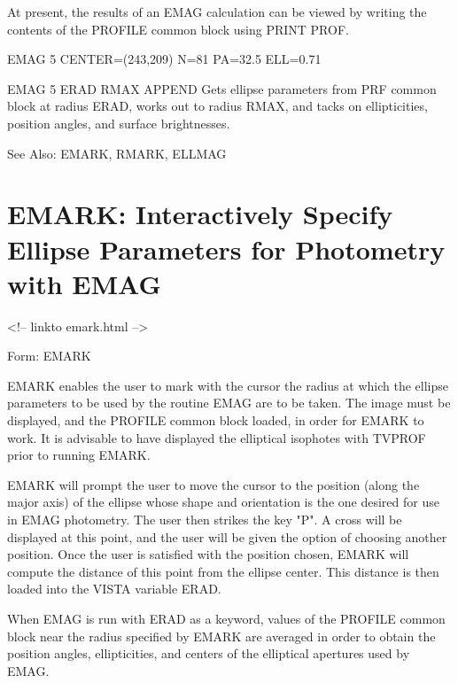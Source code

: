 At present, the results of an EMAG calculation can be viewed by writing the
contents of the PROFILE common block using PRINT PROF.

\begin{example}
  \item[EMAG 5 CENTER=(243,209) N=81 PA=32.5 ELL=0.71\hfill]{}

  \item[EMAG 5 ERAD RMAX APPEND\hfill]{Gets ellipse parameters from PRF
       common block at radius ERAD, works out to radius RMAX, and tacks on
       ellipticities, position angles, and surface brightnesses.}
\end{example}

See Also: EMARK, RMARK, ELLMAG


\section{EMARK: Interactively Specify Ellipse Parameters for 
        Photometry with EMAG}
\begin{rawhtml}
<!-- linkto emark.html -->
\end{rawhtml}
\begin{command}
  \item[Form: EMARK\hfill]{}
\end{command}

EMARK enables the user to mark with the cursor the radius at which the
ellipse parameters to be used by the routine EMAG are to be taken. The
image must be displayed, and the PROFILE common block loaded, in order for
EMARK to work. It is advisable to have displayed the elliptical isophotes
with TVPROF prior to running EMARK.

EMARK will prompt the user to move the cursor to the position (along the
major axis) of the ellipse whose shape and orientation is the one desired
for use in EMAG photometry. The user then strikes the key "P". A cross will
be displayed at this point, and the user will be given the option of
choosing another position. Once the user is satisfied with the position
chosen, EMARK will compute the distance of this point from the ellipse
center. This distance is then loaded into the VISTA variable ERAD.

When EMAG is run with ERAD as a keyword, values of the PROFILE common block
near the radius specified by EMARK are averaged in order to obtain the
position angles, ellipticities, and centers of the elliptical apertures
used by EMAG.

